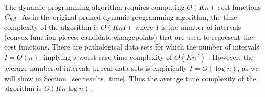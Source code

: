 \documentclass{article}
\begin{document}


The dynamic programming algorithm requires computing $O(Kn)$
cost functions $C_{k,t}$. As in the original pruned
dynamic programming algorithm, the time complexity of the algorithm is
$O(K n I)$ where $I$ is the number of intervals (convex function
pieces; candidate changepoints) that are used to represent the cost
functions. There are pathological data sets for which the number of
intervals $I=O(n)$, implying a worst-case time complexity of
$O(K n^2)$ \citep{pruned-dp-new}. However, the average number of
intervals in real data sets is empirically $I=O(\log n)$, as we will
show in Section~\ref{sec:results_time}. Thus the average time
complexity of the algorithm is $O(K n \log n)$.
\end{document}
